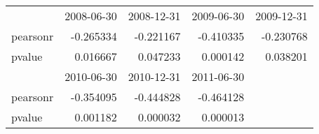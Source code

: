 \begin{tabular}{lrrrr}
    \toprule
    {}       & 2008-06-30 & 2008-12-31 & 2009-06-30 & 2009-12-31 \\
    pearsonr & -0.265334  & -0.221167  & -0.410335  & -0.230768  \\
    pvalue   & 0.016667   & 0.047233   & 0.000142   & 0.038201   \\
    \midrule
    {}       & 2010-06-30 & 2010-12-31 & 2011-06-30 &            \\
    pearsonr & -0.354095  & -0.444828  & -0.464128  &            \\
    pvalue   & 0.001182   & 0.000032   & 0.000013   &            \\
    \bottomrule
\end{tabular}
